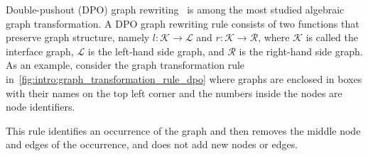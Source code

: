  Double-pushout (DPO) graph rewriting~\cite{corradini1997algebraic,habel2001double} is among the most studied algebraic graph transformation. A DPO graph rewriting rule consists of two functions that preserve graph structure, namely $l:\mathcal{K} \to \mathcal{L}$ and $r:\mathcal{K} \to \mathcal{R}$, where $\mathcal{K}$ is called the interface graph, $\mathcal{L}$ is the left-hand side graph, and $\mathcal{R}$ is the right-hand side graph. As an example, consider the graph transformation rule in~\autoref{fig:intro:graph_transformation_rule_dpo} where graphs are enclosed in boxes with their names on the top left corner and the numbers inside the nodes are node identifiers.
  \begin{figure}[!ht]
    \centering
    \caption{}
    \label{fig:intro:graph_transformation_rule_dpo}
\end{figure}
This rule identifies an occurrence of the graph
 and then removes the middle node and edges of the occurrence, and does not add new nodes or edges. 

